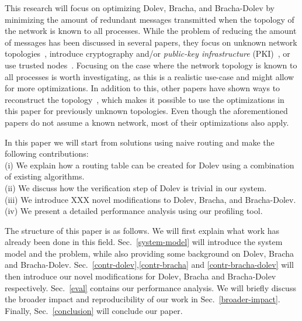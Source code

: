 This research will focus on optimizing Dolev, Bracha, and Bracha-Dolev by minimizing the amount of redundant messages transmitted when the topology of the network is known to all processes. While the problem of reducing the amount of messages has been discussed in several papers, they focus on unknown network topologies~\cite{dolev-improvement,bonomi2019multihop,bonomi2021practical}, introduce cryptography and/or \textit{public-key infrastructure} (PKI)~\cite{signatures-crypo-1,pki-crypto-2}, or use trusted nodes~\cite{using-tee}. Focusing on the case where the network topology is known to all processes is worth investigating, as this is a realistic use-case and might allow for more optimizations. In addition to this, other papers have shown ways to reconstruct the topology~\cite{topology-discovery}, which makes it possible to use the optimizations in this paper for previously unknown topologies.
Even though the aforementioned papers do not assume a known network, most of their optimizations also apply.

In this paper we will start from solutions using naive routing and make the following contributions:\\
(i) We explain how a routing table can be created for Dolev using a combination of existing algorithms.\\
(ii) We discuss how the verification step of Dolev is trivial in our system.\\
(iii) We introduce XXX novel modifications to Dolev, Bracha, and Bracha-Dolev.\\
(iv) We present a detailed performance analysis using our profiling tool.

The structure of this paper is as follows. We will first explain what work has already been done in this field. Sec.~\ref{system-model} will introduce the system model and the problem, while also providing some background on Dolev, Bracha and Bracha-Dolev. Sec.~\ref{contr-dolev},\ref{contr-bracha} and \ref{contr-bracha-dolev} will then introduce our novel modifications for Dolev, Bracha and Bracha-Dolev respectively. Sec.~\ref{eval} contains our performance analysis. We will briefly discuss the broader impact and reproducibility of our work in Sec.~\ref{broader-impact}. Finally, Sec.~\ref{conclusion} will conclude our paper.

